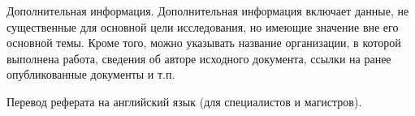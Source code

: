 


Дополнительная информация. Дополнительная информация включает данные, не
существенные для основной цели исследования, но имеющие значение вне его
основной темы. Кроме того, можно указывать название организации, в которой
выполнена работа, сведения об авторе исходного документа, ссылки на ранее
опубликованные документы и т.п.





\newpage
{}

Перевод реферата на английский язык (для специалистов и магистров).
